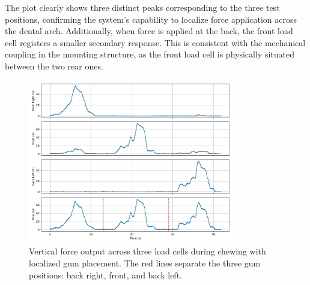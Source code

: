 The plot clearly shows three distinct peaks corresponding to the three test positions, confirming the system's capability to localize force application 
across the dental arch. Additionally, when force is applied at the back, the front load cell registers a smaller secondary response. This is consistent 
with the mechanical coupling in the mounting structure, as the front load cell is physically situated between the two rear ones.

\begin{figure}[H]
    \centering 
    \includegraphics[width=0.8\textwidth]{figures/ForceDistributionGum.png}
    \caption{Vertical force output across three load cells during chewing with localized gum placement.  
    The red lines separate the three gum positions: back right, front, and back left.}
    \label{fig:force_distribution_gum}
\end{figure}

